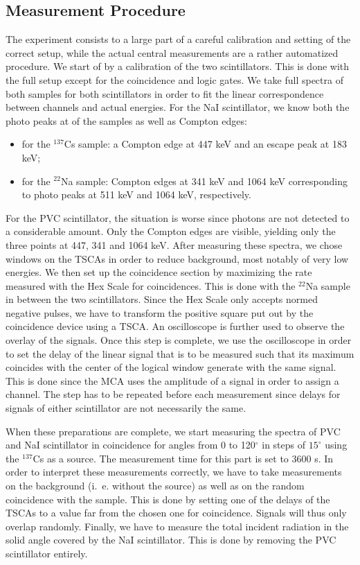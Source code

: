 \subsection{Measurement Procedure}
\label{sec:procedure}
The experiment consists to a large part of a careful calibration and setting of the correct setup, while the actual 
central measurements are a rather automatized procedure. We start of by a calibration of the two scintillators. 
This is done with the full setup except for the coincidence and logic gates. We take full spectra of both samples for 
both scintillators in order to fit the linear correspondence between channels and actual energies. For the NaI 
scintillator, we know both the photo peaks at of the samples as well as Compton edges:
\begin{itemize}
    \item for the $^{137}$Cs sample: a Compton edge at 447 keV and an escape peak at 183 keV;
    \item for the $^{22}$Na sample: Compton edges at 341 keV and 1064 keV corresponding to photo peaks at 511 keV and 
        1064 keV, respectively.
\end{itemize}
For the PVC scintillator, the situation is worse since photons are not detected to a considerable amount. 
Only the Compton edges are visible, yielding only the three points at 447, 341 and 1064 keV. 
After measuring these spectra, we chose windows on the TSCAs in order to reduce background, most notably of very low 
energies. We then set up the coincidence section by maximizing the rate measured with the Hex Scale for 
coincidences. This is done with the $^{22}$Na sample in between the two scintillators. Since the Hex Scale only accepts 
normed negative pulses, we have to transform the positive square put out by the coincidence device using a TSCA. 
An oscilloscope is further used to observe the overlay of the signals. Once this step is complete, we use the oscilloscope 
in order to set the delay of the linear signal that is to be measured such that its maximum coincides with the center 
of the logical window generate with the same signal. This is done since the MCA uses the amplitude of a signal in order 
to assign a channel. The step has to be repeated before each measurement since delays for signals of either scintillator 
are not necessarily the same. 

When these preparations are complete, we start measuring the spectra of PVC and NaI scintillator in coincidence for 
angles from 0 to 120$^\circ$ in steps of $15^\circ$ using the $^{137}$Cs as a source. The measurement time for this 
part is set to 3600 s. In order to interpret 
these measurements correctly, we have to take measurements on the background (i.~e. without the source) as well as on the 
random coincidence with the sample. This is done by setting one of the delays of the TSCAs to a value far from the chosen 
one for coincidence. Signals will thus only overlap randomly. Finally, we have to measure the total incident radiation 
in the solid angle covered by the NaI scintillator. This is done by removing the PVC scintillator entirely.  


